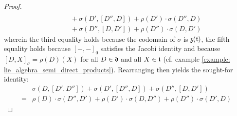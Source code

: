 \begin{proof}
$$\begin{aligned}
                                \\
                                & \qquad + \sigma(D', [D'', D]) + \rho(D') \cdot \sigma(D'', D)
                                \\
                                & \qquad + \sigma(D'', [D, D']) + \rho(D'') \cdot \sigma(D, D')
                        \end{aligned}
                    $$
                wherein the third equality holds because the codomain of $\sigma$ is $\mathfrak{z}(\mathfrak{t})$, the fifth equality holds because $[-, -]_0$ satisfies the Jacobi identity and because $[D, X]_{\sigma} = \rho(D)(X)$ for all $D \in \mathfrak{d}$ and all $X \in \mathfrak{t}$ (cf. example \ref{example: lie_algebra_semi_direct_products}). Rearranging then yields the sought-for identity:
                    $$
                        \begin{aligned}
                            & \sigma( D, [D', D''] ) + \sigma( D', [D'', D] ) + \sigma( D'', [D, D'] )
                            \\
                            = & \rho(D) \cdot \sigma(D'', D') + \rho(D') \cdot \sigma(D, D'') + \rho(D'') \cdot \sigma(D', D)
                        \end{aligned}
                    $$


\end{proof}
